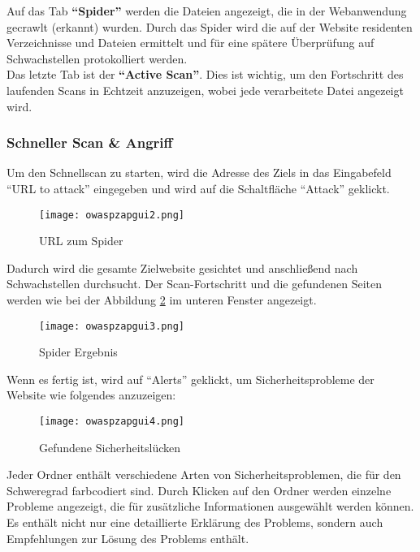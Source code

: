 Auf das Tab \textbf{"`Spider"'} werden die Dateien angezeigt, die in der Webanwendung gecrawlt (erkannt) wurden. Durch das Spider wird die auf der Website residenten Verzeichnisse und Dateien ermittelt und für eine spätere Überprüfung auf Schwachstellen protokolliert werden.\\

Das letzte Tab ist der \textbf{"`Active Scan"'}. Dies ist wichtig, um den Fortschritt des laufenden Scans in Echtzeit anzuzeigen, wobei jede verarbeitete Datei angezeigt wird.\\

\subsubsection{Schneller Scan \& Angriff}

Um den Schnellscan zu starten, wird die Adresse des Ziels in das Eingabefeld "`URL to attack"' eingegeben und wird auf die Schaltfläche "`Attack"' geklickt.

\begin{figure}[h]
	\centering
	\texttt{[image: owaspzapgui2.png]}
	\caption{URL zum Spider}
	\label{quickscan2}
\end{figure}

Dadurch wird die gesamte Zielwebsite gesichtet und anschließend nach Schwachstellen durchsucht. Der Scan-Fortschritt und die gefundenen Seiten werden wie bei der Abbildung \ref{quickscan3} im unteren Fenster angezeigt.

\begin{figure}[h]
	\centering
	\texttt{[image: owaspzapgui3.png]}
	\caption{Spider Ergebnis}
	\label{quickscan3}
\end{figure}

Wenn es fertig ist, wird auf "`Alerts"' geklickt, um Sicherheitsprobleme der Website wie folgendes anzuzeigen:

\begin{figure}[h]
	\centering
	\texttt{[image: owaspzapgui4.png]}
	\caption{Gefundene Sicherheitslücken}
	\label{quickscan4}
\end{figure}

Jeder Ordner enthält verschiedene Arten von Sicherheitsproblemen, die für den Schweregrad farbcodiert sind. Durch Klicken auf den Ordner werden einzelne Probleme angezeigt, die für zusätzliche Informationen ausgewählt werden können. Es enthält nicht nur eine detaillierte Erklärung des Problems, sondern auch Empfehlungen zur Lösung des Problems enthält.

